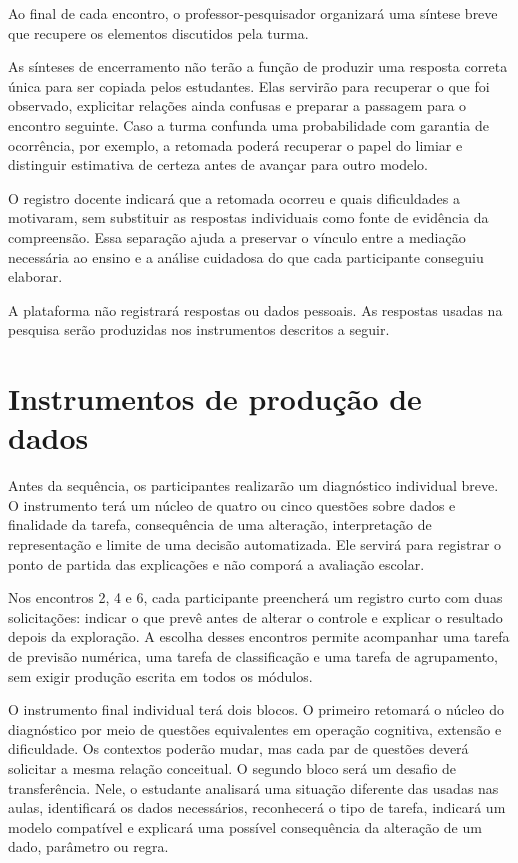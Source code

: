 Ao final de cada encontro, o professor-pesquisador organizará uma síntese breve que recupere os elementos discutidos pela turma.

As sínteses de encerramento não terão a função de produzir uma resposta correta única para ser copiada pelos estudantes. Elas servirão para recuperar o que foi observado, explicitar relações ainda confusas e preparar a passagem para o encontro seguinte. Caso a turma confunda uma probabilidade com garantia de ocorrência, por exemplo, a retomada poderá recuperar o papel do limiar e distinguir estimativa de certeza antes de avançar para outro modelo.

O registro docente indicará que a retomada ocorreu e quais dificuldades a motivaram, sem substituir as respostas individuais como fonte de evidência da compreensão. Essa separação ajuda a preservar o vínculo entre a mediação necessária ao ensino e a análise cuidadosa do que cada participante conseguiu elaborar.

A plataforma não registrará respostas ou dados pessoais. As respostas usadas na pesquisa serão produzidas nos instrumentos descritos a seguir.

\section{Instrumentos de produção de dados}

Antes da sequência, os participantes realizarão um diagnóstico individual breve. O instrumento terá um núcleo de quatro ou cinco questões sobre dados e finalidade da tarefa, consequência de uma alteração, interpretação de representação e limite de uma decisão automatizada. Ele servirá para registrar o ponto de partida das explicações e não comporá a avaliação escolar.

Nos encontros 2, 4 e 6, cada participante preencherá um registro curto com duas solicitações: indicar o que prevê antes de alterar o controle e explicar o resultado depois da exploração. A escolha desses encontros permite acompanhar uma tarefa de previsão numérica, uma tarefa de classificação e uma tarefa de agrupamento, sem exigir produção escrita em todos os módulos.

O instrumento final individual terá dois blocos. O primeiro retomará o núcleo do diagnóstico por meio de questões equivalentes em operação cognitiva, extensão e dificuldade. Os contextos poderão mudar, mas cada par de questões deverá solicitar a mesma relação conceitual. O segundo bloco será um desafio de transferência. Nele, o estudante analisará uma situação diferente das usadas nas aulas, identificará os dados necessários, reconhecerá o tipo de tarefa, indicará um modelo compatível e explicará uma possível consequência da alteração de um dado, parâmetro ou regra.

